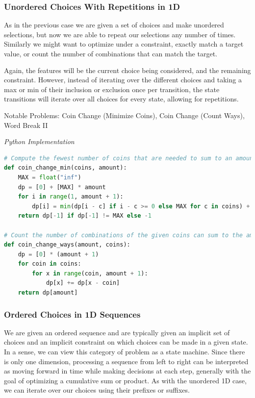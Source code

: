 \documentclass{article}
\newcommand{\comment}[1]{}
\begin{document}
\subsubsection*{Unordered Choices With Repetitions in 1D}
As in the previous case we are given a set of choices and make unordered selections, but now we are able to repeat our selections any number of times. Similarly we might want to optimize under a constraint, exactly match a target value, or count the number of combinations that can match the target.

Again, the features will be the current choice being considered, and the remaining constraint. However, instead of iterating over the different choices and taking a max or min of their inclusion or exclusion once per transition, the state transitions will iterate over all choices for every state, allowing for repetitions.

Notable Problems: Coin Change (Minimize Coins), Coin Change (Count Ways), Word Break II

\vspace{8pt} \emph{Python Implementation}
\begin{lstlisting}[language=Python]
# Compute the fewest number of coins that are needed to sum to an amount
def coin_change_min(coins, amount):
    MAX = float("inf")
    dp = [0] + [MAX] * amount
    for i in range(1, amount + 1):
        dp[i] = min(dp[i - c] if i - c >= 0 else MAX for c in coins) + 1 
    return dp[-1] if dp[-1] != MAX else -1
    
# Count the number of combinations of the given coins can sum to the amount
def coin_change_ways(amount, coins):
    dp = [0] * (amount + 1)
    for coin in coins:
        for x in range(coin, amount + 1):
            dp[x] += dp[x - coin]
    return dp[amount]
\end{lstlisting}

\subsubsection*{Ordered Choices in 1D Sequences}

\comment{
- sliding window with state (?)

for state1 in all values of state1:
    for state2 in in all values of state2:
        for ...
            dp[state1][state2][...] = best_choice(choice1, choice2, ...)
}

We are given an ordered sequence and are typically given an implicit set of choices and an implicit constraint on which choices can be made in a given state. In a sense, we can view this category of problem as a state machine. Since there is only one dimension, processing a sequence from left to right can be interpreted as moving forward in time while making decisions at each step, generally with the goal of optimizing a cumulative sum or product. As with the unordered 1D case, we can iterate over our choices using their prefixes or suffixes.
\end{document}
